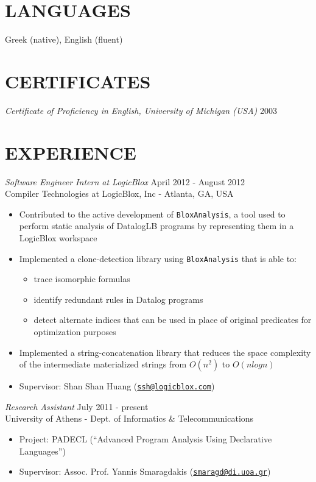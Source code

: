 \documentclass[margin]{res}
\begin{document}
\begin{resume}
\section{LANGUAGES} Greek (native), English (fluent)

\section{CERTIFICATES}
        {\sl Certificate of Proficiency in English, University of Michigan (USA)} \hfill 2003

\section{EXPERIENCE}

        {\sl Software Engineer Intern at LogicBlox} \hfill April 2012 - August 2012 \\
        Compiler Technologies at LogicBlox, Inc - Atlanta, GA, USA
        \begin{itemize}
        \item Contributed to the active development of \texttt{BloxAnalysis},
          a tool used to perform static analysis of DatalogLB programs
          by representing them in a LogicBlox workspace
        \item Implemented a clone-detection library using \texttt{BloxAnalysis}
          that is able to: 
          \begin{itemize} 
          \item trace isomorphic formulas
          \item identify redundant rules in Datalog programs
          \item detect alternate indices that can be used in place of original predicates 
            for optimization purposes
          \end{itemize}
        \item Implemented a string-concatenation library that reduces the space complexity
          of the intermediate materialized strings from $O(n^2)$ to $O(nlogn)$
        \item Supervisor: Shan Shan Huang
          (\href{mailto:ssh@logicblox.com}{\nolinkurl{ssh@logicblox.com}})
        \end{itemize}

        {\sl Research Assistant} \hfill July 2011 - present \\
        University of Athens - Dept. of Informatics \& Telecommunications
        \begin{itemize} \itemsep -2pt %
        \item Project: PADECL (``Advanced Program Analysis Using Declarative Languages'')
        \item Supervisor: Assoc. Prof. Yannis Smaragdakis
          (\href{mailto:smaragd@di.uoa.gr}{\nolinkurl{smaragd@di.uoa.gr}})
        \end{itemize}
        

\end{resume}
\end{document}
